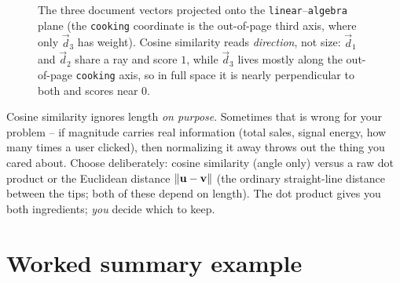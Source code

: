 \begin{figure}[htbp]
\centering
{}
\caption{The three document vectors projected onto the
\texttt{linear}--\texttt{algebra} plane (the \texttt{cooking} coordinate is the
out-of-page third axis, where only $\vec d_3$ has weight). Cosine similarity reads
\emph{direction}, not size: $\vec d_1$ and $\vec d_2$ share a ray and score $1$,
while $\vec d_3$ lives mostly along the out-of-page \texttt{cooking} axis, so in
full space it is nearly perpendicular to both and scores near $0$.}
\label{ch04:cosine}
\end{figure}

\begin{trapbox}
Cosine similarity ignores length \emph{on purpose}. Sometimes that is wrong for your
problem -- if magnitude carries real information (total sales, signal energy, how
many times a user clicked), then normalizing it away throws out the thing you
cared about. Choose deliberately: cosine similarity (angle only) versus a raw dot
product or the Euclidean distance $\lVert\mathbf{u}-\mathbf{v}\rVert$ (the ordinary straight-line
distance between the tips; both of these depend on length). The dot product gives you both
ingredients; \emph{you} decide which to keep.
\end{trapbox}

\section{Worked summary example}

